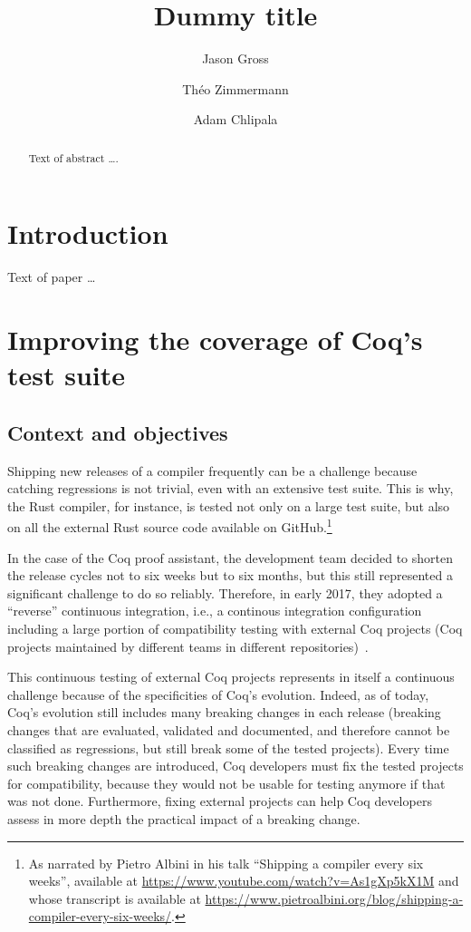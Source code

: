 \documentclass[a4paper,UKenglish,anonymous,cleveref,autoref,thm-restate]{lipics-v2021}
\title{Dummy title} %
\author{Jason Gross}{CSAIL, Massachusetts Institute of Technology, 77 Massachusetts Avenue, Cambridge, MA 02139, USA \and MIRI, USA \and \url{https://jasongross.github.io/} }{jgross@mit.edu}{https://orcid.org/0000-0002-9427-4891}{}%
\author{Théo Zimmermann}{Department of Informatics, Dummy College, [optional: Address], Country}{joanrpublic@dummycollege.org}{[orcid]}{[funding]}
\author{Adam Chlipala}{CSAIL, Massachusetts Institute of Technology, 77 Massachusetts Avenue, Cambridge, MA 02139, USA \and \url{http://adam.chlipala.net/} }{adamc@csail.mit.edu}{[orcid]}{[funding]}
\begin{document}
\maketitle

\begin{abstract}
Text of abstract \ldots.
\end{abstract}


\section{Introduction}

Text of paper \ldots

\section{Improving the coverage of Coq's test suite}

\subsection{Context and objectives}

Shipping new releases of a compiler frequently can be a challenge
because catching regressions is not trivial, even with an extensive
test suite.
%
This is why, the Rust compiler, for instance, is tested not only on a
large test suite, but also on all the external Rust source code
available on GitHub.\footnote{As narrated by Pietro Albini in his talk
``Shipping a compiler every six weeks'', available at
\url{https://www.youtube.com/watch?v=As1gXp5kX1M} and whose transcript
is available at
\url{https://www.pietroalbini.org/blog/shipping-a-compiler-every-six-weeks/}.}

In the case of the Coq proof assistant, the development team decided
to shorten the release cycles not to six weeks but to six months, but
this still represented a significant challenge to do so reliably.
%
Therefore, in early 2017, they adopted a ``reverse'' continuous
integration, i.e., a continous integration configuration including a
large portion of compatibility testing with external Coq projects (Coq
projects maintained by different teams in different
repositories)~\cite{zimmermann:tel-02451322}.

This continuous testing of external Coq projects represents in itself
a continuous challenge because of the specificities of Coq's
evolution.
%
Indeed, as of today, Coq's evolution still includes many breaking
changes in each release (breaking changes that are evaluated,
validated and documented, and therefore cannot be classified as
regressions, but still break some of the tested projects).
%
Every time such breaking changes are introduced, Coq developers must
fix the tested projects for compatibility, because they would not be
usable for testing anymore if that was not done.
%
Furthermore, fixing external projects can help Coq developers assess
in more depth the practical impact of a breaking change.
\end{document}
